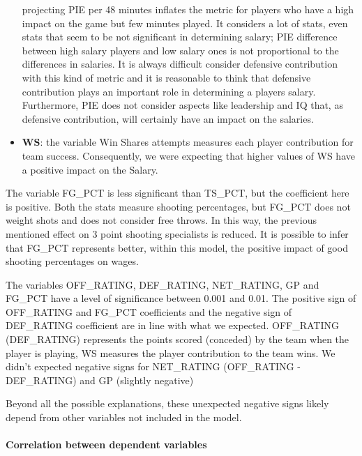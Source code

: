 \documentclass[
]{article}
\begin{document}
\begin{itemize}
  projecting PIE per 48 minutes inflates the metric for players who have
  a high impact on the game but few minutes played. It considers a lot
  of stats, even stats that seem to be not significant in determining
  salary; PIE difference between high salary players and low salary ones
  is not proportional to the differences in salaries. It is always
  difficult consider defensive contribution with this kind of metric and
  it is reasonable to think that defensive contribution plays an
  important role in determining a players salary. Furthermore, PIE does
  not consider aspects like leadership and IQ that, as defensive
  contribution, will certainly have an impact on the salaries.
\item
  \textbf{WS}: the variable Win Shares attempts measures each player
  contribution for team success. Consequently, we were expecting that
  higher values of WS have a positive impact on the Salary.
\end{itemize}

The variable FG\_PCT is less significant than TS\_PCT, but the
coefficient here is positive. Both the stats measure shooting
percentages, but FG\_PCT does not weight shots and does not consider
free throws. In this way, the previous mentioned effect on 3 point
shooting specialists is reduced. It is possible to infer that FG\_PCT
represents better, within this model, the positive impact of good
shooting percentages on wages.

The variables OFF\_RATING, DEF\_RATING, NET\_RATING, GP and FG\_PCT have
a level of significance between 0.001 and 0.01. The positive sign of
OFF\_RATING and FG\_PCT coefficients and the negative sign of
DEF\_RATING coefficient are in line with what we expected. OFF\_RATING
(DEF\_RATING) represents the points scored (conceded) by the team when
the player is playing, WS measures the player contribution to the team
wins. We didn't expected negative signs for NET\_RATING (OFF\_RATING -
DEF\_RATING) and GP (slightly negative)

Beyond all the possible explanations, these unexpected negative signs
likely depend from other variables not included in the model.

\hypertarget{correlation-between-dependent-variables}{%
\paragraph{Correlation between dependent
variables}\label{correlation-between-dependent-variables}}
\end{document}

